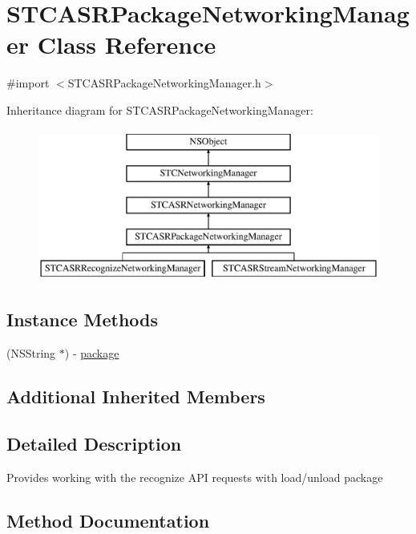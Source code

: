 \hypertarget{interface_s_t_c_a_s_r_package_networking_manager}{}\section{S\+T\+C\+A\+S\+R\+Package\+Networking\+Manager Class Reference}
\label{interface_s_t_c_a_s_r_package_networking_manager}


{\ttfamily \#import $<$S\+T\+C\+A\+S\+R\+Package\+Networking\+Manager.\+h$>$}

Inheritance diagram for S\+T\+C\+A\+S\+R\+Package\+Networking\+Manager\+:\begin{figure}[H]
\begin{center}
\leavevmode
\includegraphics[height=5.000000cm]{interface_s_t_c_a_s_r_package_networking_manager}
\end{center}
\end{figure}
\subsection*{Instance Methods}
\begin{DoxyCompactItemize}
\item 
(N\+S\+String $\ast$) -\/ \hyperlink{interface_s_t_c_a_s_r_package_networking_manager_a057072c7a7d5965f22472ac905d2e01e}{package}
\end{DoxyCompactItemize}
\subsection*{Additional Inherited Members}


\subsection{Detailed Description}
Provides working with the recognize A\+PI requests with load/unload package 

\subsection{Method Documentation}
\hypertarget{interface_s_t_c_a_s_r_package_networking_manager_a057072c7a7d5965f22472ac905d2e01e}{}\label{interface_s_t_c_a_s_r_package_networking_manager_a057072c7a7d5965f22472ac905d2e01e} 
